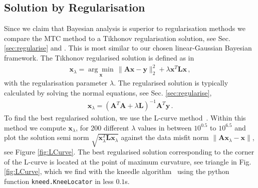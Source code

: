 \subsection{Solution by Regularisation}
\label{sec:reg}
Since we claim that Bayesian analysis is superior to regularisation methods we compare the MTC method to a Tikhonov regularisation solution, see Sec. \ref{sec:regularise} and \cite{fox2016fast}.
This is most similar to our chosen linear-Gaussian Bayesian framework.
The Tikhonov regularised solution is defined as in~\cite{hansen2010discrete, fox2016fast} 
\begin{align}
	\bm{x}_{\lambda} =\underset{ \bm{x}}{\arg \min}\,  \lVert \bm{A}\bm{x} - \bm{y} \rVert_2^2 + \lambda \bm{x}^T \bm{L} \bm{x} \, ,
	\label{eq:XLam}
\end{align}
with the regularisation parameter $\lambda$.
The regularised solution is typically calculated by solving the normal equations, see Sec. \ref{sec:regularise},
\begin{align}
	\bm{x}_{\lambda} = (\bm{A}^T\bm{A} + \lambda \bm{L} )^{-1} \bm{A}^T \bm{y} \label{eq:xLam} \, .
\end{align}
To find the best regularised solution, we use the L-curve method~\cite{hansen1993use}.
Within this method we compute $\bm{x}_\lambda$, for 200 different $\lambda$ values in between $10^{0.5}$ to $10^{6.5}$ and plot the solution semi norm $\sqrt{\bm{x}_\lambda^T\mathbf{L} \bm{x}_\lambda}$ against the data misfit norm $\lVert \bm{A}\bm{x}_\lambda - \bm{x} \rVert$, see Figure \ref{fig:LCurve}. 
The best regularised solution corresponding to the corner of the L-curve is located at the point of maximum curvature, see triangle in Fig. \ref{fig:LCurve}, which we find with the kneedle algorithm~\cite{satopaa2011kneedle} using the python function \texttt{kneed.KneeLocator} in less $0.1$s.
